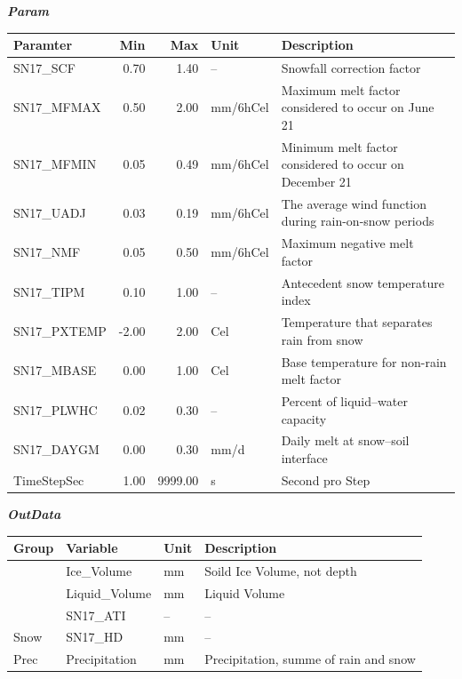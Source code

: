 \documentclass[
]{book}
\begin{document}
\textbf{\emph{Param}}

\begin{table}[!h]
\centering
\begin{tabular}{l|r|r|l|l}
\hline
Paramter & Min & Max & Unit & Description\\
\hline
SN17\_SCF & 0.70 & 1.40 & -- & Snowfall correction factor\\
\cline{1-5}
SN17\_MFMAX & 0.50 & 2.00 & mm/6hCel & Maximum melt factor considered to occur on June 21\\
\cline{1-5}
SN17\_MFMIN & 0.05 & 0.49 & mm/6hCel & Minimum melt factor considered to occur on December 21\\
\cline{1-5}
SN17\_UADJ & 0.03 & 0.19 & mm/6hCel & The average wind function during rain-on-snow periods\\
\cline{1-5}
SN17\_NMF & 0.05 & 0.50 & mm/6hCel & Maximum negative melt factor\\
\cline{1-5}
SN17\_TIPM & 0.10 & 1.00 & -- & Antecedent snow temperature index\\
\cline{1-5}
SN17\_PXTEMP & -2.00 & 2.00 & Cel & Temperature that separates rain from snow\\
\cline{1-5}
SN17\_MBASE & 0.00 & 1.00 & Cel & Base temperature for non-rain melt factor\\
\cline{1-5}
SN17\_PLWHC & 0.02 & 0.30 & -- & Percent of liquid–water capacity\\
\cline{1-5}
SN17\_DAYGM & 0.00 & 0.30 & mm/d & Daily melt at snow–soil interface\\
\cline{1-5}
TimeStepSec & 1.00 & 9999.00 & s & Second pro Step\\
\hline
\end{tabular}
\end{table}

\textbf{\emph{OutData}}

\begin{table}[!h]
\centering
\begin{tabular}{l|l|l|l}
\hline
Group & Variable & Unit & Description\\
\hline
 & Ice\_Volume & mm & Soild Ice Volume, not depth\\
\cline{2-4}
 & Liquid\_Volume & mm & Liquid Volume\\
\cline{2-4}
 & SN17\_ATI & -- & --\\
\cline{2-4}
\multirow{-4}{*}{\raggedright\arraybackslash Snow} & SN17\_HD & mm & --\\
\cline{1-4}
Prec & Precipitation & mm & Precipitation, summe of rain and snow\\
\hline
\end{tabular}
\end{table}
\end{document}
